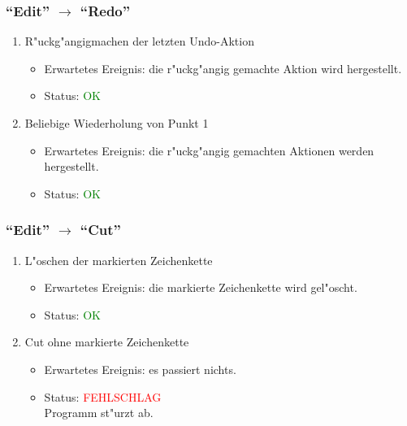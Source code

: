 \subsubsection{"`Edit"' $\rightarrow$ "`Redo"'}
\begin{enumerate}
\item R"uckg"angigmachen der letzten Undo-Aktion
\begin{itemize}
\item Erwartetes Ereignis: die r"uckg"angig gemachte Aktion wird hergestellt. 
\item Status: \textcolor{green}{OK}
\end{itemize}
\item Beliebige Wiederholung von Punkt 1
\begin{itemize}
\item Erwartetes Ereignis: die r"uckg"angig gemachten Aktionen werden hergestellt. 
\item Status: \textcolor{green}{OK}
\end{itemize}
\end{enumerate}
\subsubsection{"`Edit"' $\rightarrow$ "`Cut"'}
\begin{enumerate}
\item L"oschen der markierten Zeichenkette
\begin{itemize}
\item Erwartetes Ereignis: die markierte Zeichenkette wird gel"oscht. 
\item Status: \textcolor{green}{OK}
\end{itemize}
\item Cut ohne markierte Zeichenkette
\begin{itemize}
\item Erwartetes Ereignis: es passiert nichts. 
\item Status: \textcolor{red}{FEHLSCHLAG} \\
Programm st"urzt ab.
\end{itemize}
\end{enumerate}
